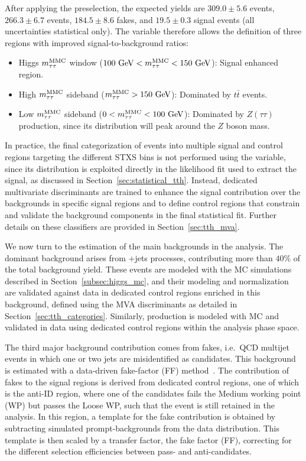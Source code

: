 After applying the preselection, the expected yields are $309.0 \pm 5.6$ \ztautau events, $266.3 \pm 6.7$ \ttbar events, $184.5 \pm 8.6$ fakes, and $19.5 \pm 0.3$ \ttHtt signal events (all uncertainties statistical only). The \mmc variable therefore allows the definition of three regions with improved signal-to-background ratios:
\begin{itemize}
    \small
    \item Higgs $m^\text{MMC}_{\tau\tau}$ window ($100~\text{GeV} < m^\text{MMC}_{\tau\tau} < 150~\text{GeV}$): Signal enhanced region.
    \item High $m^\text{MMC}_{\tau\tau}$ sideband ($m^\text{MMC}_{\tau\tau} > 150~\text{GeV}$): Dominated by $t\bar{t}$ events.
    \item Low $m^\text{MMC}_{\tau\tau}$ sideband ($0 < m^\text{MMC}_{\tau\tau} < 100~\text{GeV}$): Dominated by $Z(\tau\tau)$ production, since its distribution will peak around the $Z$ boson mass.
\end{itemize}

In practice, the final categorization of events into multiple signal and control regions targeting the different STXS bins is not performed using the \mmc variable, since its distribution is exploited directly in the likelihood fit used to extract the signal, as discussed in Section~\ref{sec:statistical_tth}. 
Instead, dedicated multivariate discriminants are trained to enhance the signal contribution over the backgrounds in specific signal regions and to define control regions that constrain and validate the background components in the final statistical fit. 
Further details on these classifiers are provided in Section~\ref{sec:tth_mva}.  

We now turn to the estimation of the main backgrounds in the \ttHtt analysis. 
The dominant background arises from \ztautau+jets processes, contributing more than $40\%$ of the total background yield. 
These events are modeled with the MC simulations described in Section~\ref{subsec:higgs_mc}, and their modeling and normalization are validated against data in dedicated control regions enriched in this background, defined using the MVA discriminants as detailed in Section~\ref{sec:tth_categories}. 
Similarly, \ttbar production is modeled with MC and validated in data using dedicated control regions within the analysis phase space.  

The third major background contribution comes from fakes, i.e.\ QCD multijet events in which one or two jets are misidentified as \tauhadvis candidates. 
This background is estimated with a data-driven fake-factor (FF) method~\cite{fakes_paper}. 
The contribution of fakes to the signal regions is derived from dedicated control regions, one of which is the anti-ID region, where one of the \tauhadvis candidates fails the Medium working point (WP) but passes the Loose WP, such that the event is still retained in the analysis. 
In this region, a template for the fake contribution is obtained by subtracting simulated prompt-\tauhadvis backgrounds from the data distribution. 
This template is then scaled by a transfer factor, the fake factor (FF), correcting for the different selection efficiencies between pass- and anti-\tauhadvis candidates.  

